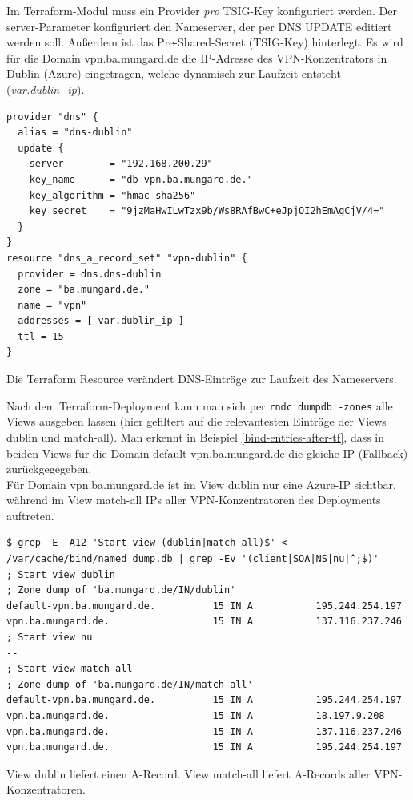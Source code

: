 Im Terraform-Modul muss ein Provider \textit{pro} TSIG-Key konfiguriert werden. Der server-Parameter konfiguriert den Nameserver, der per DNS UPDATE editiert werden soll. Außerdem ist das Pre-Shared-Secret (TSIG-Key) hinterlegt. Es wird für die Domain vpn.ba.mungard.de die IP-Adresse des VPN-Konzentrators in Dublin (Azure) eingetragen, welche dynamisch zur Laufzeit entsteht (\textit{var.dublin\_ip}).
\begin{listing}[h]
\begin{verbatim}
provider "dns" {
  alias = "dns-dublin"
  update {
    server        = "192.168.200.29"
    key_name      = "db-vpn.ba.mungard.de."
    key_algorithm = "hmac-sha256"
    key_secret    = "9jzMaHwILwTzx9b/Ws8RAfBwC+eJpjOI2hEmAgCjV/4="
  }
}
resource "dns_a_record_set" "vpn-dublin" {
  provider = dns.dns-dublin
  zone = "ba.mungard.de."
  name = "vpn"
  addresses = [ var.dublin_ip ]
  ttl = 15
}
\end{verbatim}
\caption{Die Terraform Resource verändert DNS-Einträge zur Laufzeit des Nameservers.}
\label{tf-provider-dns}
\end{listing}\FloatBarrier
Nach dem Terraform-Deployment kann man sich per \texttt{rndc dumpdb -zones} alle Views ausgeben lassen (hier gefiltert auf die relevantesten Einträge der Views \glqq dublin\grqq{} und \glqq match-all\grqq{}). Man erkennt in Beispiel \ref{bind-entries-after-tf}, dass in beiden Views für die Domain default-vpn.ba.mungard.de die gleiche IP (\glqq Fallback\grqq{}) zurückgegegeben.\\
Für Domain vpn.ba.mungard.de ist im View \glqq dublin\grqq{} nur eine Azure-IP sichtbar, während im View \glqq match-all\grqq{} IPs aller VPN-Konzentratoren des Deployments auftreten.
\begin{listing}[h]
\begin{verbatim}
$ grep -E -A12 'Start view (dublin|match-all)$' < /var/cache/bind/named_dump.db | grep -Ev '(client|SOA|NS|nu|^;$)'
; Start view dublin
; Zone dump of 'ba.mungard.de/IN/dublin'
default-vpn.ba.mungard.de.          15 IN A           195.244.254.197
vpn.ba.mungard.de.                  15 IN A           137.116.237.246
; Start view nu
--
; Start view match-all
; Zone dump of 'ba.mungard.de/IN/match-all'
default-vpn.ba.mungard.de.          15 IN A           195.244.254.197
vpn.ba.mungard.de.                  15 IN A           18.197.9.208
vpn.ba.mungard.de.                  15 IN A           137.116.237.246
vpn.ba.mungard.de.                  15 IN A           195.244.254.197

\end{verbatim}
\caption{View \glqq dublin\grqq{} liefert einen A-Record. View \glqq match-all\grqq{} liefert A-Records aller VPN-Konzentratoren.}
\label{bind-entries-after-tf}
\end{listing}\FloatBarrier
